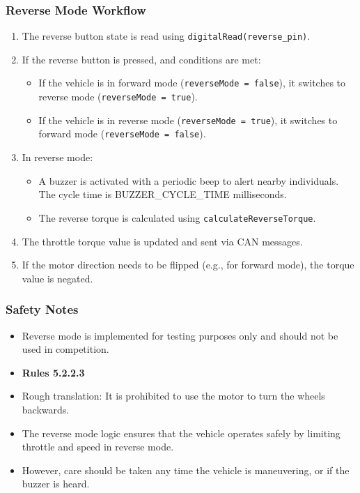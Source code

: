 \documentclass[a4paper,12pt]{article}
\begin{document}
\subsubsection{Reverse Mode Workflow}
\begin{enumerate}
    \item The reverse button state is read using \texttt{digitalRead(reverse\_pin)}.
    \item If the reverse button is pressed, and conditions are met:
    \begin{itemize}
        \item If the vehicle is in forward mode (\texttt{reverseMode = false}), it switches to reverse mode (\texttt{reverseMode = true}).
        \item If the vehicle is in reverse mode (\texttt{reverseMode = true}), it switches to forward mode (\texttt{reverseMode = false}).
    \end{itemize}
    \item In reverse mode:
    \begin{itemize}
        \item A buzzer is activated with a periodic beep to alert nearby individuals. The cycle time is {BUZZER\_CYCLE\_TIME} milliseconds.
        \item The reverse torque is calculated using \texttt{calculateReverseTorque}.
    \end{itemize}
    \item The throttle torque value is updated and sent via CAN messages.
    \item If the motor direction needs to be flipped (e.g., for forward mode), the torque value is negated.
\end{enumerate}

\subsubsection{Safety Notes}
\begin{itemize}
    \item Reverse mode is implemented for testing purposes only and should not be used in competition.
    \item \textbf{Rules 5.2.2.3}
    \item Rough translation: It is prohibited to use the motor to turn the wheels backwards.
    \item The reverse mode logic ensures that the vehicle operates safely by limiting throttle and speed in reverse mode.
    \item However, care should be taken any time the vehicle is maneuvering, or if the buzzer is heard.
\end{itemize}
\end{document}
